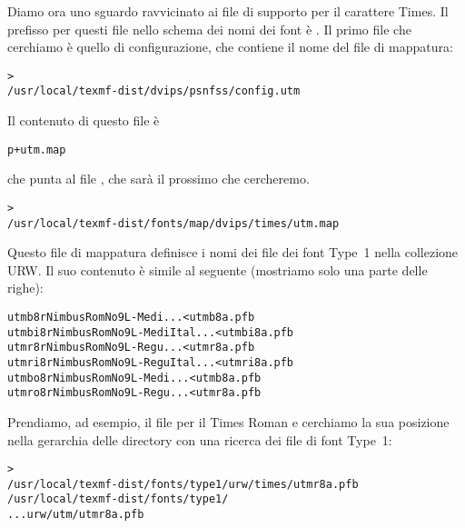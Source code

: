 \documentclass{article}
\begin{document}
Diamo ora uno sguardo ravvicinato ai file di supporto per il carattere
\PS{}  Times. Il prefisso per questi file nello schema dei nomi
dei font è . Il primo file che cerchiamo è quello di
configurazione, che contiene il nome del file di mappatura:
\begin{alltt}
> 
   /usr/local/texmf-dist/dvips/psnfss/config.utm
\end{alltt}
Il contenuto di questo file è
\begin{alltt}
  p +utm.map
\end{alltt}
che punta al file , che sarà il prossimo che cercheremo.
\begin{alltt}
> 
   /usr/local/texmf-dist/fonts/map/dvips/times/utm.map
\end{alltt}
Questo file di mappatura definisce i nomi dei file dei font \PS{} Type~1
nella collezione URW. Il suo contenuto è simile al seguente (mostriamo
solo una parte delle righe):
\begin{alltt}
utmb8r  NimbusRomNo9L-Medi    ... <utmb8a.pfb
utmbi8r NimbusRomNo9L-MediItal... <utmbi8a.pfb
utmr8r  NimbusRomNo9L-Regu    ... <utmr8a.pfb
utmri8r NimbusRomNo9L-ReguItal... <utmri8a.pfb
utmbo8r NimbusRomNo9L-Medi    ... <utmb8a.pfb
utmro8r NimbusRomNo9L-Regu    ... <utmr8a.pfb
\end{alltt}
Prendiamo, ad esempio, il file per il Times Roman  e
cerchiamo la sua posizione nella gerarchia delle directory 
con una ricerca dei file di font Type~1:
\begin{alltt}
> 
\ifSingleColumn   /usr/local/texmf-dist/fonts/type1/urw/times/utmr8a.pfb
\else   /usr/local/texmf-dist/fonts/type1/
... urw/utm/utmr8a.pfb
\fi\end{alltt}
\end{document}
